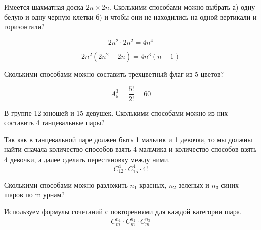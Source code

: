 \begin{task}
    Имеется шахматная доска $2n \times 2n$. Сколькими способами можно выбрать а) одну белую
    и одну черную клетки б) и чтобы они не находились на одной вертикали и горизонтали?
    \begin{solution}[a]
        \begin{equation*}
            2n^2 \cdot 2n^2 = 4n^4
        \end{equation*}
    \end{solution}
    \begin{solution}[б]
        \begin{equation*}
            2n^2(2n^2 - 2n) = 4n^3(n - 1)
        \end{equation*}
    \end{solution}
\end{task}

\begin{task}
    Сколькими способами можно составить трехцветный флаг из 5 цветов?
    \begin{solution}
        \begin{equation*}
            A^3_5 = \frac{5!}{2!} = 60
        \end{equation*}
    \end{solution}
\end{task}

\begin{task}
    В группе 12 юношей и 15 девушек. Сколькими способами можно из них составить 4 танцевальные пары?
    \begin{solution}
        Так как в танцевальной паре должен быть 1 мальчик и 1 девочка, то мы должны найти сначала
        количество способов взять 4 мальчика и количество способов взять 4 девочки, а далее сделать перестановку
        между ними.
        \begin{equation*}
            C^4_{12} \cdot C^4_{15} \cdot 4!
        \end{equation*}
    \end{solution}
\end{task}

\begin{task}
    Сколькими способами можно разложить $n_1$ красных, $n_2$ зеленых и $n_3$ синих
    шаров по m урнам?
    \begin{solution}
        Используем формулы сочетаний с повторениями для каждой категории шара.
        \begin{equation*}
            \overline{C^{n_1}_m} \cdot \overline{C^{n_2}_m} \cdot \overline{C^{n_3}_m}
        \end{equation*}
    \end{solution}
\end{task}
